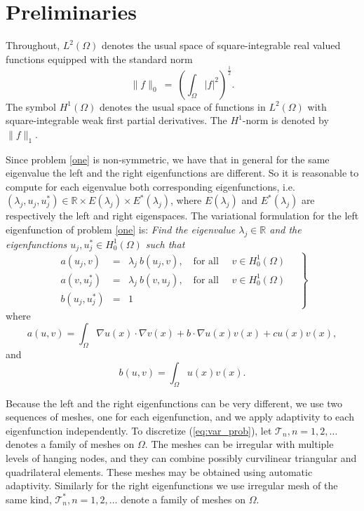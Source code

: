 \documentclass[smallextended]{svjour3}
\newcommand{\cT}{\mathcal{T}}
\begin{document}

\section{Preliminaries}\label{sec:preli}

Throughout, $L^2(\Omega)$
denotes the usual space of square-integrable real valued functions
equipped with the standard norm
\begin{equation}\label{eq:l2}
\|f\|_{0}\ = \ \left(\int_\Omega  |f|^2\right)^{\frac{1}{2}} .
\end{equation}
The symbol $H^1(\Omega)$ denotes the usual space of functions in $L^2(\Omega)$
with square-integrable weak first partial derivatives. The $H^1$-norm is 
denoted by $\|f\|_1$.

Since problem \eqref{one} is non-symmetric, we have that in general for the same eigenvalue the left and the right eigenfunctions are different. So it is reasonable to compute for each eigenvalue both corresponding eigenfunctions, i.e. $(\lambda_j,u_j,u_j^*)\in \mathbb{R}\times E(\lambda_j)\times E^*(\lambda_j)$, where $E(\lambda_j)$ and $E^*(\lambda_j)$ are respectively the left and right eigenspaces.
The variational formulation for the left eigenfunction of problem \eqref{one} is:
\emph{Find the eigenvalue $\lambda_j\in \mathbb{R}$ and the eigenfunctions $u_j,u_j^*\in H^1_0(\Omega)$
such that}
\begin{equation}
\label{eq:var_prob}
\left.
\begin{array}{lcl}
a(u_j,v)&=& \lambda_j\ b(u_j,v),
\quad \text{for all } \quad v  \in H^1_0(\Omega)\\
a(v,u_j^*)&=& \lambda_j\ b(v,u_j),
\quad \text{for all } \quad v  \in H^1_0(\Omega)\\
 b(u_j,u_j^*) &=& 1
\end{array}\quad
\right\}
\end{equation}
where
\begin{equation}\label{eq:a}
a(u,v)=\int_\Omega \nabla u(x)\cdot \nabla v(x) + b\cdot \nabla u(x) v(x) + cu(x)v(x),
\end{equation}
and
\begin{equation}\label{eq:b}
b(u,v)=\int_\Omega u(x) v(x).
\end{equation}



Because the left and the right eigenfunctions can be very different, we use two sequences of meshes, one for each eigenfunction, and we apply adaptivity to each eigenfunction independently. 
To discretize (\ref{eq:var_prob}), let $\cT_n, n =
1,2,\ldots $ denotes a family of meshes on $\Omega$.
The meshes can be irregular with multiple levels of hanging nodes, 
and they can combine possibly curvilinear triangular and quadrilateral 
elements. These meshes may be obtained using automatic adaptivity. 
Similarly for the right eigenfunctions we use irregular mesh of the same kind,  $\cT_n^*, n =
1,2,\ldots $ denote a family of meshes on $\Omega$.
\end{document}

